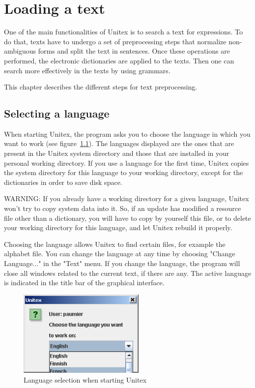 \chapter{Loading a text}
\label{chap-text}

One of the main functionalities of Unitex is to search a text for expressions.
To do that, texts have to undergo a set of preprocessing steps that  normalize
non-ambiguous forms and split the text  in sentences. Once these operations are
performed, the electronic dictionaries are applied to the texts. Then one  can
search more effectively in the texts by using  grammars.

\bigskip
\noindent This chapter describes the different steps for text preprocessing.


\section{Selecting a language}
When starting Unitex, the program asks you to choose the language in which you
want to work (see figure~\ref{fig-language-selection}). The languages
displayed are the ones that are present in the
Unitex system directory
and those that are  installed in your
personal working directory.
If you use a language for the
first time, Unitex copies the system directory for this language to your working
directory, except for the dictionaries in order to save disk space.

\bigskip
\noindent WARNING: If
you already have a working directory for a given language, Unitex won't try to
copy system data into it. So, if an update has modified a resource file other
than a dictionary, you will have to copy by yourself this file, or to delete your
working directory for this language, and let Unitex rebuild it properly.

\bigskip
\noindent 
Choosing the language allows Unitex to find certain files, for example the
alphabet file.  You can change the language at any time by
choosing "Change Language..." in the "Text" menu. If you change the language, the
program will close all windows related to the current text, if there are any. The
active language is indicated in the title bar of the graphical interface.

\begin{figure}[!h]
\begin{center}
\includegraphics[width=6.2cm]{resources/img/fig2-1.png}
\caption{\label{fig-language-selection}Language selection when starting
Unitex}
\end{center}
\end{figure}


